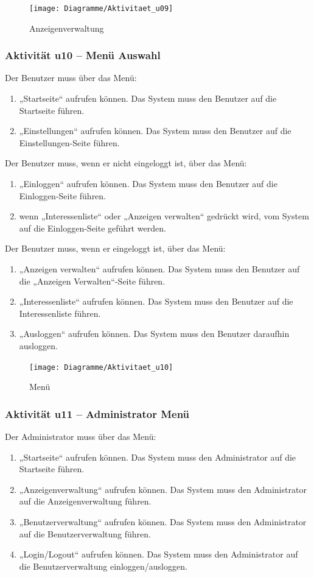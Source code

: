 \documentclass[a4paper,12pt,oneside]{scrartcl}
\begin{document}
\begin{figure}[!htbp]
\centering
\noindent\texttt{[image: Diagramme/Aktivitaet\_u09]}
\caption{Anzeigenverwaltung}
\end{figure}
\FloatBarrier

\subsubsection{Aktivität u10 – Menü Auswahl}
Der Benutzer muss über das Menü:
\begin{enumerate}
	\item „Startseite“ aufrufen können. Das System muss den Benutzer auf die Startseite führen.
	\item „Einstellungen“ aufrufen können. Das System muss den Benutzer auf die Einstellungen-Seite führen.
\end{enumerate}
Der Benutzer muss, wenn er nicht eingeloggt ist, über das Menü:
\begin{enumerate}
	\item „Einloggen“ aufrufen können. Das System muss den Benutzer auf die Einloggen-Seite führen.
	\item wenn „Interessenliste“ oder „Anzeigen verwalten“ gedrückt wird, vom System auf die Einloggen-Seite geführt werden.
\end{enumerate}
Der Benutzer muss, wenn er eingeloggt ist, über das Menü:
\begin{enumerate}
	\item „Anzeigen verwalten“ aufrufen können. Das System muss den Benutzer auf die „Anzeigen Verwalten“-Seite führen.
	\item „Interessenliste“ aufrufen können. Das System muss den Benutzer auf die Interessenliste führen.
	\item „Ausloggen“ aufrufen können. Das System muss den Benutzer daraufhin ausloggen. 
\end{enumerate}

\begin{figure}[!htbp]
\centering
\noindent\texttt{[image: Diagramme/Aktivitaet\_u10]}
\caption{Menü}
\end{figure}
\FloatBarrier

\subsubsection{Aktivität u11 – Administrator Menü}
Der Administrator muss über das Menü:

\begin{enumerate}
	\item „Startseite“ aufrufen können. Das System muss den Administrator auf die Startseite führen.
	\item „Anzeigenverwaltung“ aufrufen können. Das System muss den Administrator auf die Anzeigenverwaltung führen.
	\item „Benutzerverwaltung“ aufrufen können. Das System muss den Administrator auf die Benutzerverwaltung führen.
	\item „Login/Logout“ aufrufen können. Das System muss den Administrator auf die Benutzerverwaltung einloggen/ausloggen.
\end{enumerate}
\end{document}
